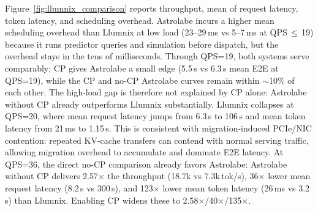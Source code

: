 Figure~\ref{fig:llumnix_comparison} reports throughput, mean of request latency, token latency, and scheduling overhead. Astrolabe incurs a higher mean scheduling overhead than Llumnix at low load (23--29\,ms vs 5--7\,ms at QPS\,$\le$\,19) because it runs predictor queries and simulation before dispatch, but the overhead stays in the tens of milliseconds. Through QPS=19, both systems serve comparably; CP gives Astrolabe a small edge (5.5\,s vs 6.3\,s mean E2E at QPS=19), while the CP and no-CP Astrolabe curves remain within $\sim$10\% of each other. The high-load gap is therefore not explained by CP alone: Astrolabe without CP already outperforms Llumnix substantially. Llumnix collapses at QPS=20, where mean request latency jumps from 6.3\,s to 106\,s and mean token latency from 21\,ms to 1.15\,s. This is consistent with migration-induced PCIe/NIC contention: repeated KV-cache transfers can contend with normal serving traffic, allowing migration overhead to accumulate and dominate E2E latency. At QPS=36, the direct no-CP comparison already favors Astrolabe: Astrolabe without CP delivers 2.57$\times$ the throughput (18.7k vs 7.3k\,tok/s), 36$\times$ lower mean request latency (8.2\,s vs 300\,s), and 123$\times$ lower mean token latency (26\,ms vs 3.2\,s) than Llumnix. Enabling CP widens these to 2.58$\times$/40$\times$/135$\times$.
